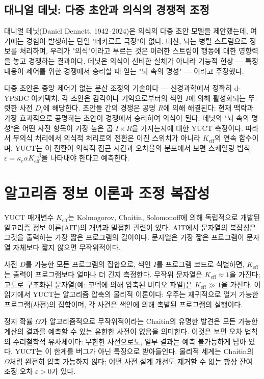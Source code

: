 \documentclass[12pt,a4paper]{article}
\begin{document}
	\subsection{대니얼 데닛: 다중 초안과 의식의 경쟁적 조정}
	
	대니얼 데닛(Daniel Dennett, 1942–2024)은 의식의 다중 초안 모델을 제안했는데, 여기에는 경험이 발생하는 단일 "데카르트 극장"이 없다. 대신, 뇌는 병렬 스트림으로 정보를 처리하며, 우리가 "의식"이라고 부르는 것은 이러한 스트림이 행동에 대한 영향력을 놓고 경쟁하는 결과이다. 데닛은 의식이 신비한 실체가 아니라 기능적 현상 — 특정 내용이 제어를 위한 경쟁에서 승리할 때 얻는 "뇌 속의 명성" — 이라고 주장했다.
	
	다중 초안은 중앙 제어기 없는 분산 조정의 기술이다 — 신경과학에서 정확히 d-YPSDC 아키텍처. 각 초안은 감각이나 기억으로부터의 색인 \(I\)에 의해 활성화되는 뚜렷한 사전 \(D_i\)에 해당한다. 초안들 간의 경쟁은 공명 \(R\)에 의해 해결된다: 현재 맥락과 가장 효과적으로 공명하는 초안이 경쟁에서 승리하여 의식이 된다. 데닛의 "뇌 속의 명성"은 어떤 사전 항목이 가장 높은 곱 \(I \times R\)을 가지는지에 대한 YUCT 측정이다. 따라서 무의식 처리에서 의식적 처리로의 전환은 이진 스위치가 아니라 \(K_{\mathrm{eff}}\)의 연속 함수이며, YUCT는 이 전환이 의식적 접근 시간과 오차율의 분포에서 보편 스케일링 법칙 \(\varepsilon = \kappa_c \alpha K_{\mathrm{eff}}^{-\beta}\)을 나타내야 한다고 예측한다.
	
	\section{알고리즘 정보 이론과 조정 복잡성}
	
	YUCT 매개변수 \(K_{\mathrm{eff}}\)는 Kolmogorov, Chaitin, Solomonoff에 의해 독립적으로 개발된 알고리즘 정보 이론(AIT)의 개념과 밀접한 관련이 있다. AIT에서 문자열의 복잡성은 그것을 출력하는 가장 짧은 프로그램의 길이이다. 문자열은 가장 짧은 프로그램이 문자열 자체보다 짧지 않으면 무작위적이다.
	
	사전 \(D\)를 가능한 모든 프로그램의 집합으로, 색인 \(I\)를 프로그램 코드로 식별하면, \(K_{\mathrm{eff}}\)는 출력이 프로그램보다 얼마나 더 긴지 측정한다. 무작위 문자열은 \(K_{\mathrm{eff}} \approx 1\)을 가진다; 고도로 구조화된 문자열(예: 코덱에 의해 압축된 비디오 파일)은 \(K_{\mathrm{eff}} \gg 1\)을 가진다. 이 읽기에서 YUCT는 알고리즘 압축의 물리적 이론이다: 우주는 재귀적으로 열거 가능한 프로그램(사전)의 집합이며, 각 사건은 색인에 의해 촉발된 프로그램의 실행이다.
	
	정지 확률 \(\Omega\)가 알고리즘적으로 무작위적이라는 Chaitin의 유명한 발견은 모든 가능한 계산의 결과를 예측할 수 있는 유한한 사전이 없음을 의미한다. 이것은 보편 오차 법칙의 수리철학적 유사체이다: 무한한 사전으로도, 일부 결과는 예측 불가능하게 남아 있다. YUCT는 이 한계를 버그가 아닌 특징으로 받아들인다. 물리적 세계는 Chaitin의 \(\Omega\)처럼 완전히 압축 가능하지 않다; 어떤 사전 설계 개선도 제거할 수 없는 항상 잔여 조정 오차 \(\varepsilon > 0\)가 있다.
	
\end{document}
